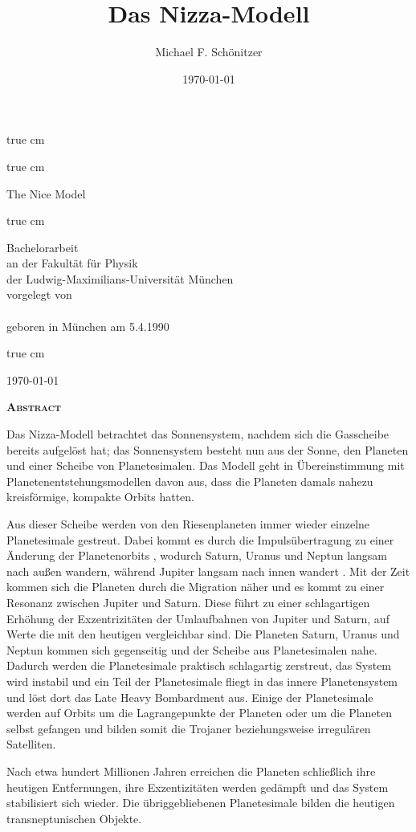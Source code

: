 \documentclass[12pt,a4paper,twoside,open=right,bibliography=totoc]{scrbook}
\author{Michael F. Schönitzer}
\title{Das Nizza-Modell}
\date{\today}
\makeatletter
\renewcommand{\cite}{ \citep}
\newcommand{\theenglishtitle}{The Nice Model}
\newcommand\abstractname{Abstract}  %
\newenvironment{abstract}{%
      \titlepage
      \null\vfil
      \@beginparpenalty\@lowpenalty
      \begin{center}%
        \bfseries \textsc{\abstractname}
        \@endparpenalty\@M
      \end{center}}%
     {\par\vfil\null\endtitlepage}
\newenvironment{abstract}{%
      \if@twocolumn
        \section*{\abstractname}%
      \else
        \small
        \begin{center}%
          {\bfseries \textsc{\abstractname}\vspace{-.5em}\vspace{\z@}}%
        \end{center}%
        \quotation
      \fi}
      {\if@twocolumn\else\endquotation\fi}
\makeatother
\begin{document}
\begin{titlepage}
\thispagestyle{empty}
 true cm
\centerline{\huge \thetitle}
 true cm
\centerline{\huge \theenglishtitle}
\bigskip\bigskip 
{} true cm

\begin{centering}\large
Bachelorarbeit\\
an der Fakultät für Physik\\
der Ludwig-Maximilians-Universität München
\\[1cm]
vorgelegt von\\
\theauthor\\
geboren in München am 5.4.1990\\
\end{centering}
 true cm
\centerline{\theauthor}
\centerline{\today}
\end{titlepage}

\begin{abstract}
Das Nizza-Modell \cite{Tsiganis2005,Morbidelli2005,Gomes2005} betrachtet das Sonnensystem, nachdem sich die Gasscheibe bereits aufgelöst hat; das Sonnensystem besteht nun aus der Sonne, den Planeten und einer Scheibe von Planetesimalen. Das Modell geht in Übereinstimmung mit Planetenentstehungsmodellen davon aus, dass die Planeten damals nahezu kreisförmige, kompakte Orbits hatten.

Aus dieser Scheibe werden von den Riesenplaneten immer wieder einzelne Planetesimale gestreut.
Dabei kommt es durch die Impulsübertragung zu einer Änderung der Planeten\-orbits\cite{Tsiganis2005},
wodurch Saturn, Uranus und Neptun langsam nach außen wandern, während Jupiter langsam nach innen wandert\cite{Hahn1999,Tsiganis2005}.
Mit der Zeit kommen sich die Planeten durch die Migration näher und es kommt zu einer Resonanz zwischen Jupiter und Saturn.
Diese führt zu einer schlagartigen Erhöhung der Exzentrizitäten der Umlaufbahnen von Jupiter und Saturn, auf Werte die mit den heutigen vergleichbar sind.
Die Planeten Saturn, Uranus und Neptun kommen sich gegenseitig und der Scheibe aus Planetesimalen nahe. Dadurch werden die Planetesimale praktisch schlagartig zerstreut, das System wird instabil und ein Teil der Planetesimale fliegt in das innere Planetensystem und löst dort das Late Heavy Bombardment aus.
Einige der Planetesimale werden auf Orbits um die Lagrangepunkte der Planeten oder um die Planeten selbst gefangen und bilden somit die Trojaner beziehungsweise irregulären Satelliten.

Nach etwa hundert Millionen Jahren erreichen die Planeten schließlich ihre heutigen Entfernungen, ihre Exzentizitäten werden gedämpft und das System stabilisiert sich wieder. Die übriggebliebenen Planetesimale bilden die heutigen transneptunischen Objekte.
\end{abstract}
\end{document}
